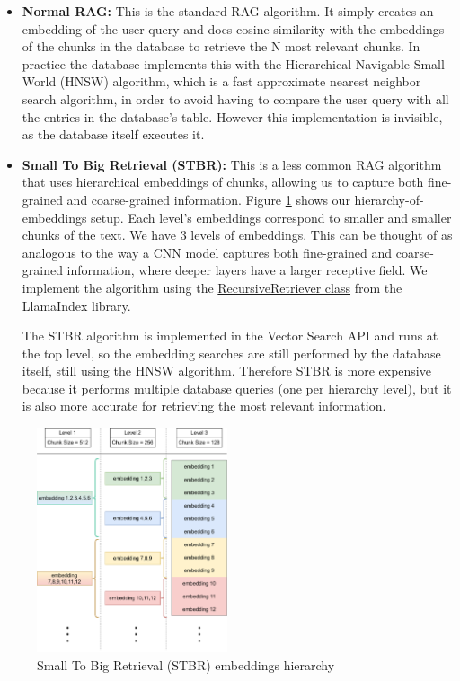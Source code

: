 \documentclass[a4paper,12pt,twoside]{ThesisStyle}
\begin{document}
\begin{itemize}
  \item \textbf{Normal RAG:} This is the standard RAG algorithm. It simply creates an embedding of the user query and does cosine similarity with the embeddings of the chunks in the database to retrieve the N most relevant chunks. In practice the database implements this with the Hierarchical Navigable Small World (HNSW) \cite{Malkov2018EfficientRobustApproximateNearestNeighbors} algorithm, which is a fast approximate nearest neighbor search algorithm, in order to avoid having to compare the user query with all the entries in the database's table. However this implementation is invisible, as the database itself executes it.
  \item \textbf{Small To Big Retrieval (STBR):} This is a less common RAG algorithm that uses hierarchical embeddings of chunks, allowing us to capture both fine-grained and coarse-grained information. Figure \ref{fig:SmallToBigRetrieval} shows our hierarchy-of-embeddings setup. Each level's embeddings correspond to smaller and smaller chunks of the text. We have 3 levels of embeddings. This can be thought of as analogous to the way a CNN model captures both fine-grained and coarse-grained information, where deeper layers have a larger receptive field. We implement the algorithm using the \href{https://docs.llamaindex.ai/en/stable/examples/retrievers/recursive_retriever_nodes/}{RecursiveRetriever class} from the LlamaIndex library.
  
  The STBR algorithm is implemented in the Vector Search API and runs at the top level, so the embedding searches are still performed by the database itself, still using the HNSW algorithm. Therefore STBR is more expensive because it performs multiple database queries (one per hierarchy level), but it is also more accurate for retrieving the most relevant information.
\end{itemize}

\begin{figure}[htb]
  \centering
  \includegraphics[width=0.5\textwidth]{img/Small To Big Retrieval.drawio.png}
  \caption{Small To Big Retrieval (STBR) embeddings hierarchy}
  \label{fig:SmallToBigRetrieval}
\end{figure}
\end{document}
